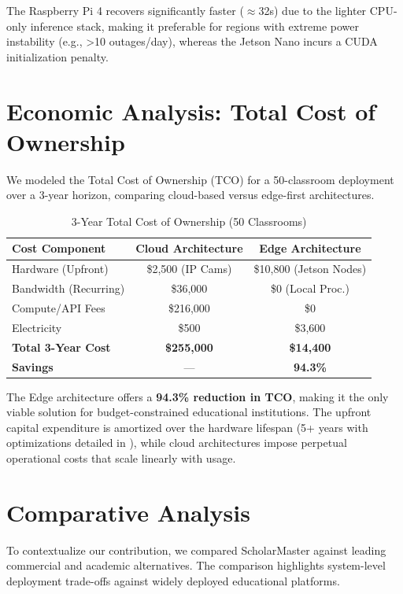 \documentclass[conference]{IEEEtran}
\begin{document}
The Raspberry Pi 4 recovers significantly faster ($\approx$32s) due to the lighter CPU-only inference stack, making it preferable for regions with extreme power instability (e.g., >10 outages/day), whereas the Jetson Nano incurs a CUDA initialization penalty.

\section{Economic Analysis: Total Cost of Ownership}

We modeled the Total Cost of Ownership (TCO) for a 50-classroom deployment over a 3-year horizon, comparing cloud-based versus edge-first architectures.

\begin{table}[h]
\caption{3-Year Total Cost of Ownership (50 Classrooms)}
\begin{center}
\begin{tabular}{lcc}
\toprule
\textbf{Cost Component} & \textbf{Cloud Architecture} & \textbf{Edge Architecture} \\
\midrule
Hardware (Upfront) & \$2,500 (IP Cams) & \$10,800 (Jetson Nodes) \\
Bandwidth (Recurring) & \$36,000 & \$0 (Local Proc.) \\
Compute/API Fees & \$216,000 & \$0 \\
Electricity & \$500 & \$3,600 \\
\textbf{Total 3-Year Cost} & \textbf{\$255,000} & \textbf{\$14,400} \\
\textbf{Savings} & — & \textbf{94.3\%} \\
\bottomrule
\end{tabular}
\end{center}
\label{tab:tco}
\end{table}

The Edge architecture offers a \textbf{94.3\% reduction in TCO}, making it the only viable solution for budget-constrained educational institutions. The upfront capital expenditure is amortized over the hardware lifespan (5+ years with optimizations detailed in \cite{paperXX:flash}), while cloud architectures impose perpetual operational costs that scale linearly with usage.

\section{Comparative Analysis}
To contextualize our contribution, we compared ScholarMaster against leading commercial and academic alternatives. The comparison highlights system-level deployment trade-offs against widely deployed educational platforms.
\end{document}
